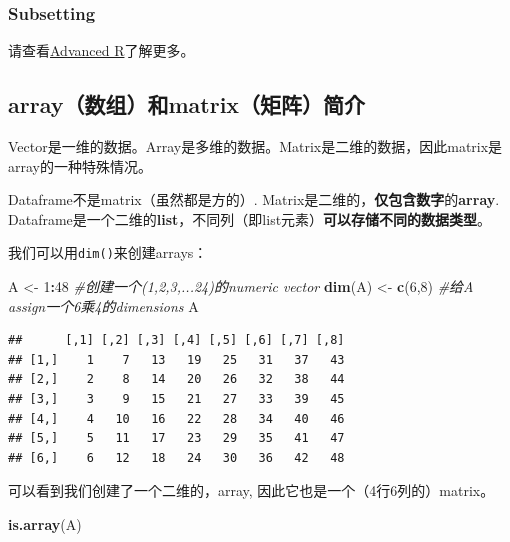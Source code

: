 \documentclass[]{book}
\newenvironment{Shaded}{\begin{snugshade}}{\end{snugshade}}
\newcommand{\CommentTok}[1]{\textcolor[rgb]{0.56,0.35,0.01}{\textit{#1}}}
\newcommand{\DecValTok}[1]{\textcolor[rgb]{0.00,0.00,0.81}{#1}}
\newcommand{\KeywordTok}[1]{\textcolor[rgb]{0.13,0.29,0.53}{\textbf{#1}}}
\newcommand{\NormalTok}[1]{#1}
\newcommand{\OperatorTok}[1]{\textcolor[rgb]{0.81,0.36,0.00}{\textbf{#1}}}
\newcommand{\StringTok}[1]{\textcolor[rgb]{0.31,0.60,0.02}{#1}}
\begin{document}
\hypertarget{dataframe-subsetting}{%
\subsubsection{Subsetting}\label{dataframe-subsetting}}

请查看\href{https://adv-r.hadley.nz/subsetting.html\#simplify-preserve}{Advanced R}了解更多。

\hypertarget{arraymatrix}{%
\subsection{array（数组）和matrix（矩阵）简介}\label{arraymatrix}}

Vector是一维的数据。Array是多维的数据。Matrix是二维的数据，因此matrix是array的一种特殊情况。

Dataframe不是matrix（虽然都是方的）. Matrix是二维的，\textbf{仅包含数字}的\textbf{array}. Dataframe是一个二维的\textbf{list}，不同列（即list元素）\textbf{可以存储不同的数据类型}。

我们可以用\texttt{dim()}来创建arrays：

\begin{Shaded}
\begin{Highlighting}[]
\NormalTok{A <-}\StringTok{ }\DecValTok{1}\OperatorTok{:}\DecValTok{48} \CommentTok{#创建一个(1,2,3,...24)的numeric vector}
\KeywordTok{dim}\NormalTok{(A) <-}\StringTok{ }\KeywordTok{c}\NormalTok{(}\DecValTok{6}\NormalTok{,}\DecValTok{8}\NormalTok{) }\CommentTok{#给A assign一个6乘4的dimensions}
\NormalTok{A}
\end{Highlighting}
\end{Shaded}

\begin{verbatim}
##      [,1] [,2] [,3] [,4] [,5] [,6] [,7] [,8]
## [1,]    1    7   13   19   25   31   37   43
## [2,]    2    8   14   20   26   32   38   44
## [3,]    3    9   15   21   27   33   39   45
## [4,]    4   10   16   22   28   34   40   46
## [5,]    5   11   17   23   29   35   41   47
## [6,]    6   12   18   24   30   36   42   48
\end{verbatim}

可以看到我们创建了一个二维的，array, 因此它也是一个（4行6列的）matrix。

\begin{Shaded}
\begin{Highlighting}[]
\KeywordTok{is.array}\NormalTok{(A)}
\end{Highlighting}
\end{Shaded}
\end{document}
